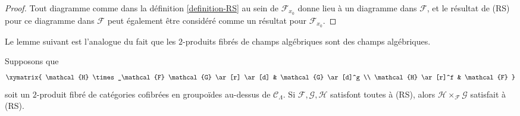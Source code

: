 \begin{proof}
Tout diagramme comme dans la définition \ref{definition-RS} au sein de
$\mathcal{F}_{x_0}$ donne lieu à un diagramme dans $\mathcal{F}$, et le
résultat de (RS) pour ce diagramme dans $\mathcal{F}$ peut également être
considéré comme un résultat pour $\mathcal{F}_{x_0}$.
\end{proof}

\noindent
Le lemme suivant est l'analogue du fait que les $2$-produits fibrés de champs
algébriques sont des champs algébriques.

\begin{lemma}
\label{lemma-RS-fiber-product-morphisms}
Supposons que
$$
\xymatrix{
\mathcal{H} \times_\mathcal{F} \mathcal{G} \ar[r] \ar[d] &
\mathcal{G} \ar[d]^g \\
\mathcal{H} \ar[r]^f & \mathcal{F}
}
$$
soit un $2$-produit fibré de catégories cofibrées en groupoïdes au-dessus de
$\mathcal{C}_\Lambda$. Si $\mathcal{F}, \mathcal{G}, \mathcal{H}$ satisfont
toutes à (RS), alors $\mathcal{H} \times_\mathcal{F} \mathcal{G}$ satisfait à
(RS).
\end{lemma}

